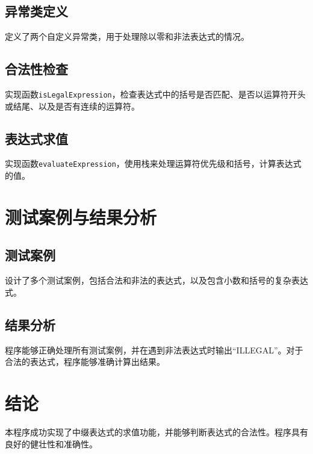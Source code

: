 \documentclass{article}
\begin{document}
\subsection{异常类定义}
定义了两个自定义异常类，用于处理除以零和非法表达式的情况。

\subsection{合法性检查}
实现函数\texttt{isLegalExpression}，检查表达式中的括号是否匹配、是否以运算符开头或结尾、以及是否有连续的运算符。

\subsection{表达式求值}
实现函数\texttt{evaluateExpression}，使用栈来处理运算符优先级和括号，计算表达式的值。

\section{测试案例与结果分析}

\subsection{测试案例}
设计了多个测试案例，包括合法和非法的表达式，以及包含小数和括号的复杂表达式。

\subsection{结果分析}
程序能够正确处理所有测试案例，并在遇到非法表达式时输出“ILLEGAL”。对于合法的表达式，程序能够准确计算出结果。

\section{结论}
本程序成功实现了中缀表达式的求值功能，并能够判断表达式的合法性。程序具有良好的健壮性和准确性。
\end{document}
